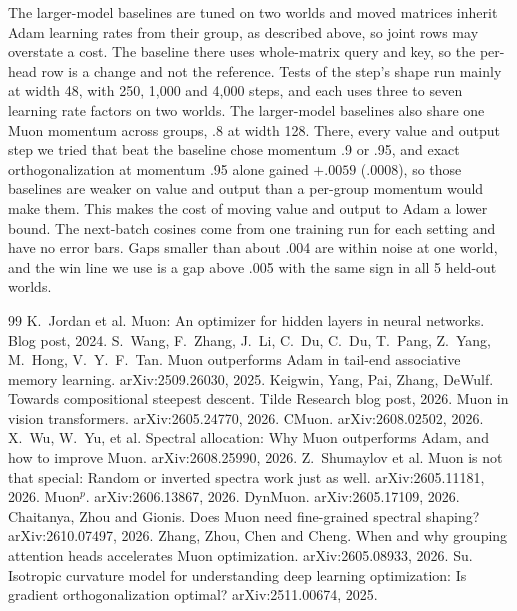 \documentclass[11pt]{article}
\begin{document}
The larger-model baselines are tuned on two worlds and moved matrices inherit Adam learning rates from their group, as described above, so joint rows may overstate a cost. The baseline there uses whole-matrix query and key, so the per-head row is a change and not the reference. Tests of the step's shape run mainly at width 48, with 250, 1,000 and 4,000 steps, and each uses three to seven learning rate factors on two worlds. The larger-model baselines also share one Muon momentum across groups, .8 at width 128. There, every value and output step we tried that beat the baseline chose momentum .9 or .95, and exact orthogonalization at momentum .95 alone gained $+.0059$ (.0008), so those baselines are weaker on value and output than a per-group momentum would make them. This makes the cost of moving value and output to Adam a lower bound. The next-batch cosines come from one training run for each setting and have no error bars. Gaps smaller than about .004 are within noise at one world, and the win line we use is a gap above .005 with the same sign in all 5 held-out worlds.


\begin{thebibliography}{99}
 K.~Jordan et al. Muon: An optimizer for hidden layers in neural networks. Blog post, 2024.
 S.~Wang, F.~Zhang, J.~Li, C.~Du, C.~Du, T.~Pang, Z.~Yang, M.~Hong, V.~Y.~F.~Tan. Muon outperforms Adam in tail-end associative memory learning. arXiv:2509.26030, 2025.
 Keigwin, Yang, Pai, Zhang, DeWulf. Towards compositional steepest descent. Tilde Research blog post, 2026.
 Muon in vision transformers. arXiv:2605.24770, 2026.
 CMuon. arXiv:2608.02502, 2026.
 X.~Wu, W.~Yu, et al. Spectral allocation: Why Muon outperforms Adam, and how to improve Muon. arXiv:2608.25990, 2026.
 Z.~Shumaylov et al. Muon is not that special: Random or inverted spectra work just as well. arXiv:2605.11181, 2026.
 Muon$^p$. arXiv:2606.13867, 2026.
 DynMuon. arXiv:2605.17109, 2026.
 Chaitanya, Zhou and Gionis. Does Muon need fine-grained spectral shaping? arXiv:2610.07497, 2026.
 Zhang, Zhou, Chen and Cheng. When and why grouping attention heads accelerates Muon optimization. arXiv:2605.08933, 2026.
 Su. Isotropic curvature model for understanding deep learning optimization: Is gradient orthogonalization optimal? arXiv:2511.00674, 2025.
\end{thebibliography}
\end{document}
